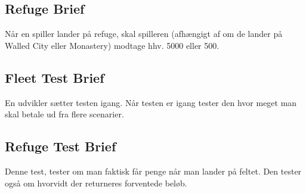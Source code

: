 \subsection{Refuge Brief}
Når en spiller lander på refuge, skal spilleren (afhængigt af om de lander på Walled City eller Monastery) modtage hhv. 5000 eller 500.  
\subsection{Fleet Test Brief}
En udvikler sætter testen igang. Når testen er igang tester den hvor meget man skal betale ud fra flere scenarier.
\subsection{Refuge Test Brief}
Denne test, tester om man faktisk får penge når man lander på feltet. Den tester også om hvorvidt der returneres forventede beløb.
\newpage